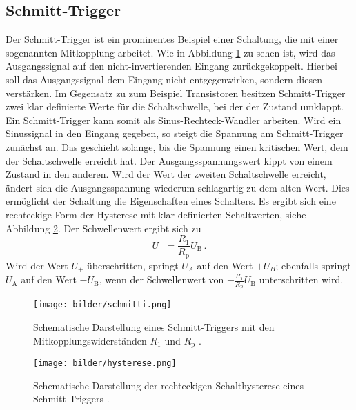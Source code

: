 \subsection{Schmitt-Trigger}
Der Schmitt-Trigger ist ein prominentes Beispiel einer Schaltung, die mit einer sogenannten Mitkopplung arbeitet. Wie in Abbildung \ref{schmitti} zu sehen ist, wird das Ausgangssignal auf den nicht-invertierenden Eingang zurückgekoppelt. Hierbei soll das Ausgangssignal dem Eingang nicht entgegenwirken, sondern diesen verstärken.
Im Gegensatz zu zum Beispiel Transistoren besitzen Schmitt-Trigger zwei klar definierte Werte für die Schaltschwelle, bei der der Zustand umklappt. Ein Schmitt-Trigger kann somit als Sinus-Rechteck-Wandler arbeiten. Wird ein Sinussignal in den Eingang gegeben, so steigt die Spannung am Schmitt-Trigger zunächst an. Das geschieht solange, bis die Spannung einen kritischen Wert, dem der Schaltschwelle erreicht hat. Der Ausgangsspannungswert kippt von einem Zustand in den anderen. Wird der Wert der zweiten Schaltschwelle erreicht, ändert sich die Ausgangsspannung wiederum schlagartig zu dem alten Wert.
Dies ermöglicht der Schaltung die Eigenschaften eines Schalters.
Es ergibt sich eine rechteckige Form der Hysterese mit klar definierten Schaltwerten, siehe Abbildung \ref{abb:hysterese}.
Der Schwellenwert ergibt sich zu
\begin{equation}
U_+=\frac{R_1}{R_\text{p}}U_\text{B}\,.
\label{eq:schmitti}
\end{equation}
Wird der Wert $U_+$ überschritten, springt $U_A$ auf den Wert $+U_B$; ebenfalls springt $U_\text{A}$ auf den Wert $-U_\text{B}$, wenn der Schwellenwert von $-\frac{R_1}{R_\text{p}}U_\text{B}$ unterschritten wird.

\begin{figure}[H]
  \centering
  \texttt{[image: bilder/schmitti.png]}
  \caption{Schematische Darstellung eines Schmitt-Triggers mit den Mitkopplungswiderständen $R_1$ und $R_\text{p}$ \cite{anleitung}.}
  \label{schmitti}
\end{figure}
\begin{figure}[H]
  \centering
  \texttt{[image: bilder/hysterese.png]}
  \caption{Schematische Darstellung der rechteckigen Schalthysterese eines Schmitt-Triggers \cite{hysterese}.}
  \label{abb:hysterese}
\end{figure}
